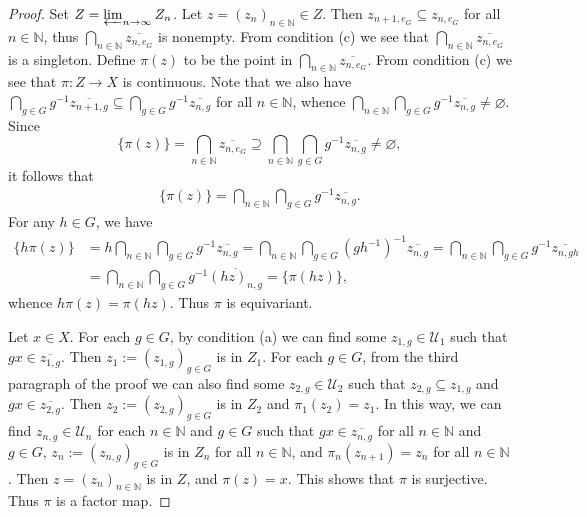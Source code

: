 \documentclass[11pt]{amsart}
\theoremstyle{definition}
\numberwithin{equation}{section}
\theoremstyle{definition}
\newcommand{\cU}{{\mathcal U}}
\newcommand{\Nb}{{\mathbb N}}
\begin{document}
\begin{proof}
Set $Z=\varprojlim_{n\to \infty} Z_n$. Let $z=(z_n)_{n\in \Nb}\in Z$. Then $z_{n+1, e_G}\subseteq z_{n, e_G}$ for all $n\in \Nb$, thus $\bigcap_{n\in \Nb}\overline{z_{n, e_G}}$ is nonempty. From condition (c) we see that $\bigcap_{n\in \Nb}\overline{z_{n, e_G}}$ is a singleton. 
Define $\pi(z)$ to be the point in $\bigcap_{n\in \Nb}\overline{z_{n, e_G}}$. From condition (c) we see that $\pi: Z\rightarrow X$ is continuous. 
Note that we also have $\bigcap_{g\in G} g^{-1}\overline{z_{n+1, g}}\subseteq \bigcap_{g\in G} g^{-1}\overline{z_{n, g}}$ for all $n\in \Nb$, whence $\bigcap_{n\in \Nb}\bigcap_{g\in G} g^{-1}\overline{z_{n, g}}\neq \varnothing$. Since
$$\{\pi(z)\}=\bigcap_{n\in \Nb}\overline{z_{n, e_G}}\supseteq \bigcap_{n\in \Nb}\bigcap_{g\in G} g^{-1}\overline{z_{n, g}}\neq \varnothing,$$
it follows that
\begin{align} \label{E-zero-dim extension}
\{\pi(z)\}= \bigcap_{n\in \Nb}\bigcap_{g\in G} g^{-1}\overline{z_{n, g}}.
\end{align}
For any $h\in G$, we have
\begin{align*}
\{h\pi(z)\}&= h\bigcap_{n\in \Nb}\bigcap_{g\in G} g^{-1}\overline{z_{n, g}}=\bigcap_{n\in \Nb}\bigcap_{g\in G} (gh^{-1})^{-1}\overline{z_{n, g}}
=\bigcap_{n\in \Nb}\bigcap_{g\in G} g^{-1}\overline{z_{n, gh}}\\
&=\bigcap_{n\in \Nb}\bigcap_{g\in G} g^{-1}\overline{(hz)_{n, g}}=\{\pi(hz)\},
 \end{align*}
 whence $h\pi(z)=\pi(hz)$. Thus $\pi$ is equivariant. 
 
 Let $x\in X$. For each $g\in G$, by condition (a) we can find some $z_{1, g}\in \cU_1$ such that $gx\in \overline{z_{1, g}}$. Then $z_1:=(z_{1, g})_{g\in G}$ is in $Z_1$. For each $g\in G$, from the third paragraph of the proof we can also find some $z_{2, g}\in \cU_2$ such that $z_{2, g}\subseteq z_{1, g}$ and $gx\in \overline{z_{2, g}}$. Then $z_2:=(z_{2, g})_{g\in G}$ is in $Z_2$ and $\pi_1(z_2)=z_1$. In this way, we can find $z_{n, g}\in \cU_n$ for each $n\in \Nb$ and $g\in G$ such that $gx\in \overline{z_{n, g}}$ for all $n\in \Nb$ and $g\in G$, $z_n:=(z_{n, g})_{g\in G}$ is in $Z_n$ for all $n\in \Nb$, and $\pi_n(z_{n+1})=z_n$ for all $n\in \Nb$. Then $z=(z_n)_{n\in \Nb}$ is in $Z$, and $\pi(z)=x$. This shows that $\pi$ is surjective. Thus $\pi$ is a factor map. 
\end{proof}
\end{document}
